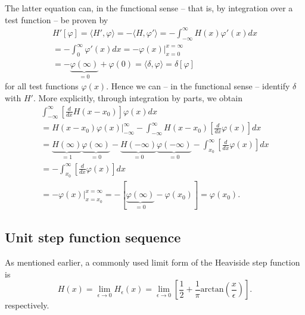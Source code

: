 {\color{OliveGreen}
\bproof
The latter equation can, in the functional sense -- that is, by integration over a test function --
be proven by
\begin{equation}
\begin{split}
H'[\varphi ]= \langle   H' , \varphi   \rangle = - \langle  H ,  \varphi'   \rangle
 =
-\int_{-\infty}^\infty H(x) \varphi' (x)  dx \\
 =
-\int_{0}^\infty  \varphi' (x)  dx
  =
-\left.   \varphi  (x) \right|_{x=0}^{x= \infty} \\
  =
 -   \underbrace{\varphi  (\infty)}_{=0} +  \varphi  (0)
  =    \langle   \delta , \varphi  \rangle  =\delta [\varphi ]
\end{split}
\end{equation}
for all test functions $\varphi (x)$. Hence we can -- in the functional sense  -- identify $\delta$ with $H'$.
More explicitly, through integration by parts, we obtain
\begin{equation}
\begin{split}
\int _{-\infty}^\infty \left[\frac{d}{dx} H(x-x_0)\right] \varphi (x) dx       \\
  =
\left. H(x-x_0) \varphi (x)\right| _{-\infty}^\infty - \int _{-\infty}^\infty H(x-x_0) \left[\frac{d}{dx} \varphi (x)\right] dx \\
  =
\underbrace{H(\infty)}_{=1}\underbrace{\varphi(\infty)}_{=0} - \underbrace{H(-\infty)}_{=0}\underbrace{\varphi(-\infty)}_{=0}
   - \int _{x_0}^\infty \left[\frac{d}{dx} \varphi (x)\right] dx  \\
 =  - \int _{x_0}^\infty \left[\frac{d}{dx} \varphi (x)\right] dx \\
 =    -  \left.  \varphi (x)   \right| _{x=x_0}^{x= \infty}
 =    - [  \underbrace{\varphi  (\infty)}_{=0}  - \varphi (x_0)]
 =     \varphi (x_0).
\end{split}
\end{equation}



\eproof
}

\subsection{Unit step function sequence}


As mentioned earlier, a commonly used limit form  of the Heaviside step function is
\begin{equation}
H(x)= \lim_{\epsilon \rightarrow 0} H_\epsilon (x)
=\lim_{\epsilon \rightarrow 0}   \left[ \frac{1 }{2} + \frac{1 }{\pi} \text{arctan}\left(  \frac{x}{\epsilon }\right) \right] .
\end{equation}
respectively.

